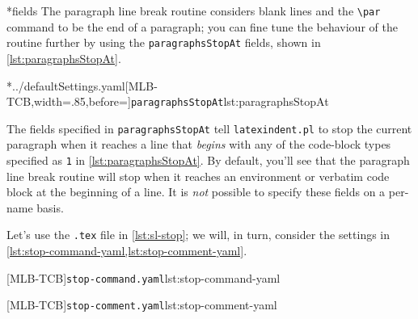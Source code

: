 *{fields}
	The paragraph line break routine considers blank lines and the
	\lstinline|\par| command to be the end of a paragraph;
	 you can fine tune the behaviour of the routine further by
	using the \texttt{paragraphsStopAt} fields, shown in \cref{lst:paragraphsStopAt}.

	\cmhlistingsfromfile[style=paragraphsStopAt]*{../defaultSettings.yaml}[MLB-TCB,width=.85\linewidth,before=\centering]{\texttt{paragraphsStopAt}}{lst:paragraphsStopAt}

	The fields specified in \texttt{paragraphsStopAt} tell \texttt{latexindent.pl} to
	stop the current paragraph when it reaches a line that \emph{begins} with
	any of the code-block types specified as \texttt{1} in
	\cref{lst:paragraphsStopAt}. By default, you'll see that the paragraph line break routine
	will stop when it reaches an environment or verbatim code block at the beginning of a
	line. It is \emph{not} possible to specify these fields on a per-name
	basis.

	Let's use the \texttt{.tex} file in \cref{lst:sl-stop}; we will,
	in turn, consider the settings in \cref{lst:stop-command-yaml,lst:stop-comment-yaml}.

	\begin{minipage}{.45\linewidth}
	\end{minipage}
	\hfill
	\begin{minipage}{.49\linewidth}
		[MLB-TCB]{\texttt{stop-command.yaml}}{lst:stop-command-yaml}

		[MLB-TCB]{\texttt{stop-comment.yaml}}{lst:stop-comment-yaml}
	\end{minipage}

